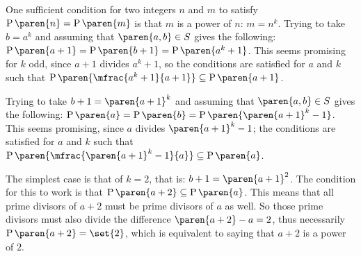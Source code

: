 One sufficient condition for two integers $n$ and $m$ to satisfy
$\operatorname{P}\paren{n} = \operatorname{P}\paren{m}$
is that $m$ is a power of $n$: $m = n^k$.
Trying to take $b = a^k$ and assuming that $\paren{a,b} \in S$ gives the following:
$\operatorname{P}\paren{a + 1} = \operatorname{P}\paren{b + 1} = \operatorname{P}\paren{a^k + 1}$.
This seems promising for $k$ odd, since $a + 1$ divides $a^k + 1$,
so the conditions are satisfied for $a$ and $k$ such that
$\operatorname{P}\paren{\mfrac{a^k + 1}{a + 1}} \subseteq \operatorname{P}\paren{a + 1}$.

Trying to take $b + 1 = \paren{a + 1}^k$ and assuming that $\paren{a,b} \in S$ gives the following:
$\operatorname{P}\paren{a} = \operatorname{P}\paren{b} = \operatorname{P}\paren{\paren{a + 1}^k - 1}$.
This seems promising, since $a$ divides $\paren{a + 1}^k - 1$;
the conditions are satisfied for $a$ and $k$ such that
$\operatorname{P}\paren{\mfrac{\paren{a + 1}^k - 1}{a}} \subseteq \operatorname{P}\paren{a}$.

The simplest case is that of $k = 2$, that is: $b + 1 = \paren{a + 1}^2$.
The condition for this to work is that $\operatorname{P}\paren{a + 2} \subseteq \operatorname{P}\paren{a}$.
This means that all prime divisors of $a + 2$ must be prime divisors of $a$ as well.
So those prime divisors must also divide the difference $\paren{a + 2} - a = 2$,
thus necessarily $\operatorname{P}\paren{a + 2} = \set{2}$,
which is equivalent to saying that $a + 2$ is a power of $2$.
